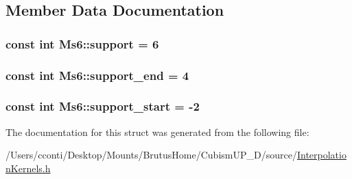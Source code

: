 \subsection{Member Data Documentation}
\hypertarget{struct_ms6_ac772f8b51bb556169f9465af9adb2ae8}{}
\subsubsection[{support}]{\setlength{\rightskip}{0pt plus 5cm}const int Ms6\+::support = 6\hspace{0.3cm}{\ttfamily [static]}}\label{struct_ms6_ac772f8b51bb556169f9465af9adb2ae8}
\hypertarget{struct_ms6_ae435e121585184ae5a790dd535741697}{}
\subsubsection[{support\+\_\+end}]{\setlength{\rightskip}{0pt plus 5cm}const int Ms6\+::support\+\_\+end = 4\hspace{0.3cm}{\ttfamily [static]}}\label{struct_ms6_ae435e121585184ae5a790dd535741697}
\hypertarget{struct_ms6_a51396c124a733a80c6ed4248191c3f67}{}
\subsubsection[{support\+\_\+start}]{\setlength{\rightskip}{0pt plus 5cm}const int Ms6\+::support\+\_\+start = -\/2\hspace{0.3cm}{\ttfamily [static]}}\label{struct_ms6_a51396c124a733a80c6ed4248191c3f67}


The documentation for this struct was generated from the following file\+:\begin{DoxyCompactItemize}
\item 
/\+Users/cconti/\+Desktop/\+Mounts/\+Brutus\+Home/\+Cubism\+U\+P\+\_\+D/source/\hyperlink{_interpolation_kernels_8h}{Interpolation\+Kernels.\+h}\end{DoxyCompactItemize}

